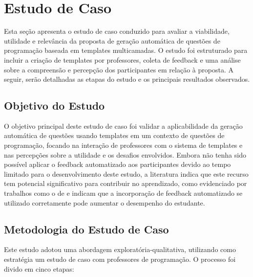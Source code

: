 \chapter{Estudo de Caso}

Esta seção apresenta o estudo de caso conduzido para avaliar a viabilidade, utilidade e relevância da proposta de geração automática de questões de programação baseada em templates multicamadas. O estudo foi estruturado para incluir a criação de templates por professores, coleta de feedback e uma análise sobre a compreensão e percepção dos participantes em relação à proposta. A seguir,  serão detalhadas as etapas do estudo e os principais resultados observados. 

\section{Objetivo do Estudo}
O objetivo principal deste estudo de caso foi validar a aplicabilidade da geração automática de questões usando templates em um contexto de questões de programação, focando na interação de professores com o sistema de templates e nas percepções sobre a utilidade e os desafios envolvidos. Embora não tenha sido possível aplicar o feedback automatizado aos participantes devido ao tempo limitado para o desenvolvimento deste estudo, a literatura  indica que este recurso tem potencial significativo para contribuir no aprendizado, como evidenciado por trabalhos como o de \parencite{vanpraet2024} e \parencite{fung2024} indicam que a incorporação de feedback automatizado se utilizado corretamente pode aumentar o desempenho do estudante.


\section{Metodologia do Estudo de Caso}

Este estudo adotou uma abordagem exploratória-qualitativa, utilizando como  estratégia um estudo de caso com professores de programação. O processo foi divido em cinco etapas:  

